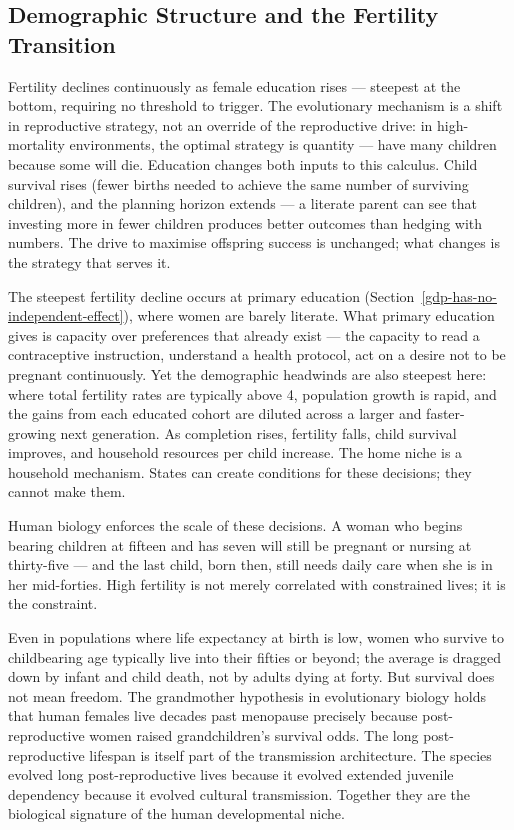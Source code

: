 \documentclass[12pt,letterpaper]{article}
\begin{document}
\subsection{Demographic Structure and the Fertility Transition}\label{demographic-structure-and-the-fertility-transition}

Fertility declines continuously as female education rises ---
steepest at the bottom, requiring no threshold to trigger. The
evolutionary mechanism is a shift in reproductive
strategy, not an override of the reproductive drive: in high-mortality
environments, the optimal strategy is quantity --- have many children
because some will die. Education changes both inputs to this calculus.
Child survival rises (fewer births needed to achieve the same number of
surviving children), and the planning horizon extends --- a literate
parent can see that investing more in fewer children produces better
outcomes than hedging with numbers. The drive to maximise offspring
success is unchanged; what changes is the strategy that serves it.

The steepest fertility decline occurs at primary education
(Section~\ref{gdp-has-no-independent-effect}), where women are barely
literate. What primary education gives is capacity over preferences that
already exist --- the capacity to read a contraceptive instruction,
understand a health protocol, act on a desire not to be pregnant
continuously. Yet the demographic headwinds are also steepest here:
where total fertility rates are typically above 4, population growth is
rapid, and the gains from each educated cohort are diluted across a
larger and faster-growing next generation. As completion rises, fertility
falls, child survival improves, and household resources per child
increase. The home niche is a household mechanism. States can create
conditions for these decisions; they cannot make them.

Human biology enforces the scale of these decisions. A woman who begins
bearing children at fifteen and has seven will still be pregnant or
nursing at thirty-five --- and the last child, born then, still needs
daily care when she is in her mid-forties. High fertility is not merely
correlated with constrained lives; it is the constraint.

Even in populations where life expectancy at birth is low, women who
survive to childbearing age typically live into their fifties or beyond;
the average is dragged down by infant and child death, not by adults
dying at forty. But survival does not mean freedom. The grandmother
hypothesis in evolutionary biology holds that human females live decades
past menopause precisely because post-reproductive women raised
grandchildren's survival odds. The long post-reproductive lifespan is
itself part of the transmission architecture. The species
evolved long post-reproductive lives because it evolved extended
juvenile dependency because it evolved cultural transmission. Together
they are the biological signature of the human developmental niche.
\end{document}

